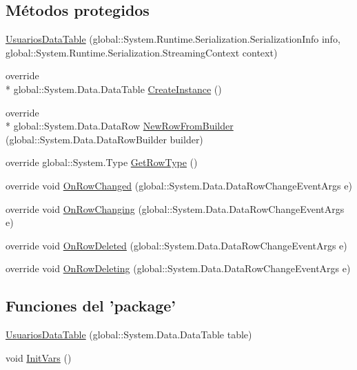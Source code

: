 \subsection*{Métodos protegidos}
\begin{DoxyCompactItemize}
\item 
\hyperlink{class_proyecto___integrador__3_1_1ds_usuarios_1_1_usuarios_data_table_a96b581ce204cec089e32772c34bd2ab4}{Usuarios\-Data\-Table} (global\-::\-System.\-Runtime.\-Serialization.\-Serialization\-Info info, global\-::\-System.\-Runtime.\-Serialization.\-Streaming\-Context context)
\item 
override \\*
global\-::\-System.\-Data.\-Data\-Table \hyperlink{class_proyecto___integrador__3_1_1ds_usuarios_1_1_usuarios_data_table_ad875794e699bf493915412739c8265a7}{Create\-Instance} ()
\item 
override \\*
global\-::\-System.\-Data.\-Data\-Row \hyperlink{class_proyecto___integrador__3_1_1ds_usuarios_1_1_usuarios_data_table_addb2f44e6a8b96955f9879db836c6e95}{New\-Row\-From\-Builder} (global\-::\-System.\-Data.\-Data\-Row\-Builder builder)
\item 
override global\-::\-System.\-Type \hyperlink{class_proyecto___integrador__3_1_1ds_usuarios_1_1_usuarios_data_table_a5cfddf29de9ca95b747dc18f4d722724}{Get\-Row\-Type} ()
\item 
override void \hyperlink{class_proyecto___integrador__3_1_1ds_usuarios_1_1_usuarios_data_table_a65f135f0ba09a5367c5613a01d70e362}{On\-Row\-Changed} (global\-::\-System.\-Data.\-Data\-Row\-Change\-Event\-Args e)
\item 
override void \hyperlink{class_proyecto___integrador__3_1_1ds_usuarios_1_1_usuarios_data_table_ab2e048bd1144c09f4209a17620ae871d}{On\-Row\-Changing} (global\-::\-System.\-Data.\-Data\-Row\-Change\-Event\-Args e)
\item 
override void \hyperlink{class_proyecto___integrador__3_1_1ds_usuarios_1_1_usuarios_data_table_aef0f3315640c3dc7f3a59bddbda90ae9}{On\-Row\-Deleted} (global\-::\-System.\-Data.\-Data\-Row\-Change\-Event\-Args e)
\item 
override void \hyperlink{class_proyecto___integrador__3_1_1ds_usuarios_1_1_usuarios_data_table_a03322ca45f413e32d3213d716fa0e4ca}{On\-Row\-Deleting} (global\-::\-System.\-Data.\-Data\-Row\-Change\-Event\-Args e)
\end{DoxyCompactItemize}
\subsection*{Funciones del 'package'}
\begin{DoxyCompactItemize}
\item 
\hyperlink{class_proyecto___integrador__3_1_1ds_usuarios_1_1_usuarios_data_table_a4c5ad477ba085b5fc6254cf57765de64}{Usuarios\-Data\-Table} (global\-::\-System.\-Data.\-Data\-Table table)
\item 
void \hyperlink{class_proyecto___integrador__3_1_1ds_usuarios_1_1_usuarios_data_table_a9f6d1e5b2d2af6710e5411059b0b58e2}{Init\-Vars} ()
\end{DoxyCompactItemize}

